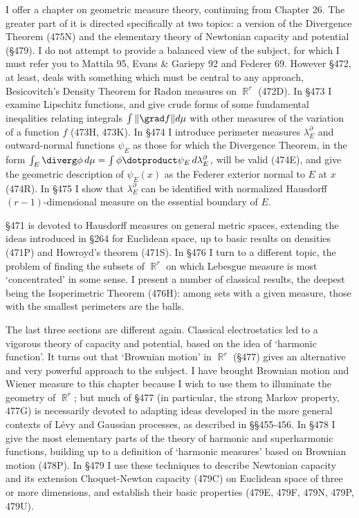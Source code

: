 
\def\chaptername{Geometric measure theory}
\def\sectionname{Introduction}

\def\varinnerprod#1#2{#1\dotproduct#2}


I offer a chapter on geometric measure theory,
continuing from Chapter 26.   The greater part of it is
directed specifically at two topics:
a version of the Divergence Theorem (475N) and the elementary theory
of Newtonian capacity and potential (\S479).
I do not attempt to provide a balanced view of the subject, 
for which I must refer you to {\smc Mattila 95},
{\smc Evans \& Gariepy 92} and {\smc Federer 69}.
However \S472, at least, deals with something which must be central to
any approach, Besicovitch's Density Theorem for Radon measures on
$\BbbR^r$ (472D).   In \S473 I examine Lipschitz functions, and give crude
forms of some fundamental ineqalities relating integrals
$\int\|\grad f\|d\mu$ with other measures of the variation of a function
$f$ (473H, 473K).   
In \S474 I introduce perimeter measures $\lambda^{\partial}_E$
and outward-normal functions $\psi_E$ as those for which the Divergence
Theorem, in the form $\int_E\diverg\phi\,d\mu
=\int\varinnerprod{\phi}{\psi_E}\,d\lambda^{\partial}_E$, will be valid
(474E), and give the geometric description of $\psi_E(x)$ as the Federer
exterior normal to $E$ at $x$ (474R).   In \S475 I show that
$\lambda^{\partial}_E$ can be identified with normalized Hausdorff
$(r-1)$-dimensional measure on the essential boundary of $E$.

\S471 is devoted to Hausdorff measures on general metric spaces, extending
the ideas introduced in \S264 for Euclidean space, up to basic results on
densities (471P) and Howroyd's theorem (471S).
In \S476 I turn to a different topic, the problem of finding the subsets
of $\BbbR^r$ on which Lebesgue measure is most `concentrated' in some
sense.   I present a number of classical results, the deepest being
the Isoperimetric Theorem (476H):  among sets with a given measure,
those with the smallest perimeters are the balls.

The last three sections are different again.   Classical electrostatics led
to a vigorous theory of capacity and potential, based on the idea of
`harmonic function'.   It turns out that `Brownian motion' in
$\BbbR^r$ (\S477)
gives an alternative and very powerful approach to the subject.   I have
brought Brownian motion and Wiener measure to this chapter because I wish
to use them to illuminate the geometry of $\BbbR^r$;  but much of \S477
(in particular, the strong Markov property, 477G) is
necessarily devoted to adapting ideas developed in the more general
contexts of L\'evy and Gaussian processes, as described in \S\S455-456.   
In \S478 I give the
most elementary parts of the theory of harmonic and superharmonic
functions, building up to a definition of `harmonic
measures' based on Brownian motion (478P).   In \S479
I use these techniques to describe Newtonian capacity and its extension
Choquet-Newton capacity (479C) on Euclidean space of three or more
dimensions, and establish their basic properties (479E,
479F, 479N, 479P, 479U).

\discrpage


